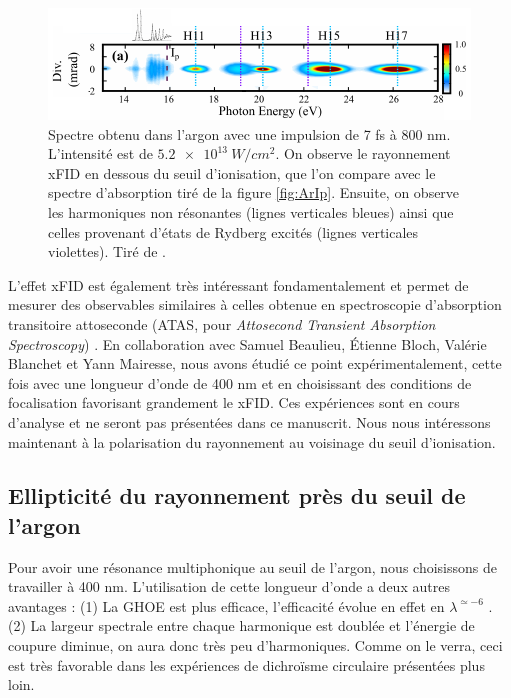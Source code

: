 \begin{figure}[!ht]
\centering
\includegraphics[width=1.1\columnwidth]{Figures/ResonantArgon/xFID.pdf}%
\caption{Spectre obtenu dans l'argon avec une impulsion de 7 fs à 800 nm. L'intensité est de $\SI{5.2e13}{W/cm^2}$. On observe le rayonnement xFID en dessous du seuil d'ionisation, que l'on compare avec le spectre d'absorption tiré de la figure \ref{fig:ArIp}. Ensuite, on observe les harmoniques non résonantes (lignes verticales bleues) ainsi que celles provenant d'états de Rydberg excités (lignes verticales violettes). Tiré de .}
\label{fig:xFID}
\end{figure}

L'effet xFID est également très intéressant fondamentalement et permet de mesurer des observables similaires à celles obtenue en spectroscopie d'absorption transitoire attoseconde (ATAS, pour \textit{Attosecond Transient Absorption Spectroscopy}) . En collaboration avec Samuel Beaulieu, \'{E}tienne Bloch, Valérie Blanchet et Yann Mairesse, nous avons étudié ce point expérimentalement, cette fois avec une longueur d'onde de 400 nm et en choisissant des conditions de focalisation favorisant grandement le xFID. Ces expériences sont en cours d'analyse et ne seront pas présentées dans ce manuscrit. Nous nous intéressons maintenant à la polarisation du rayonnement au voisinage du seuil d'ionisation.

\subsection{Ellipticité du rayonnement près du seuil de l'argon}
\label{sec:resonant_argon_exp}
Pour avoir une résonance multiphonique au seuil de l'argon, nous choisissons de travailler à 400 nm. L'utilisation de cette longueur d'onde a deux autres avantages : (1) La GHOE est plus efficace, l'efficacité évolue en effet en $\lambda^{\simeq-6}$ . (2) La largeur spectrale entre chaque harmonique est doublée et l'énergie de coupure diminue, on aura donc très peu d'harmoniques. Comme on le verra, ceci est très favorable dans les expériences de dichroïsme circulaire présentées plus loin. 

